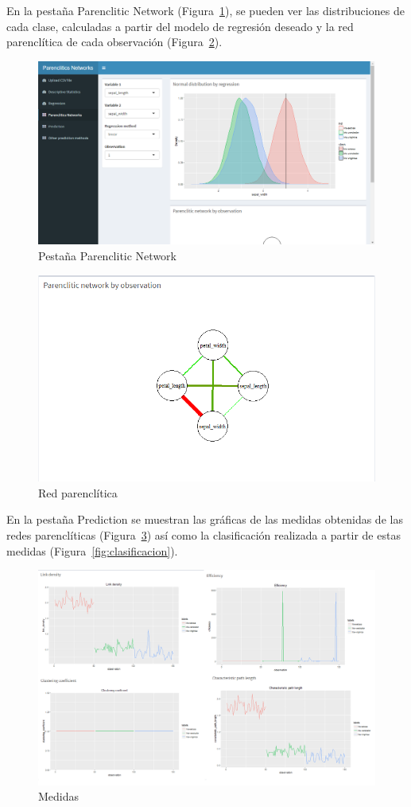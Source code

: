 En la pestaña Parenclitic Network (Figura~\ref{fig:pn}), se pueden ver las distribuciones de cada clase, calculadas a partir del modelo de regresión deseado y la red parenclítica de cada observación (Figura~\ref{fig:parencliticNetwork}). 

\begin{figure}[tbph!]
	\centering
	\includegraphics[width=0.7\linewidth]{imagenes/pn}
	\caption{Pestaña Parenclitic Network}
	\label{fig:pn}
\end{figure}

\begin{figure}[tbph!]
	\centering
	\includegraphics[width=0.7\linewidth]{imagenes/parencliticNetwork}
	\caption{Red parenclítica}
	\label{fig:parencliticNetwork}
\end{figure}

En la pestaña Prediction se muestran las gráficas de las medidas obtenidas de las redes parenclíticas (Figura~\ref{fig:medidas}) así como la clasificación realizada a partir de estas medidas (Figura~\ref{fig:clasificacion}).\\

\begin{figure}[tbph!]
	\centering
	\includegraphics[width=0.7\linewidth]{imagenes/medidas}
	\caption{Medidas}
	\label{fig:medidas}
\end{figure}

